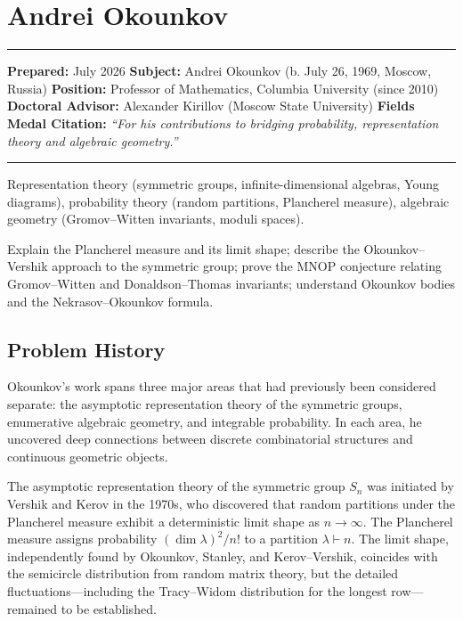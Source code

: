 \chapter{Andrei Okounkov}\label{ch2006andreiokounkov:andrei-okounkov-fields-medal-2006-a-comprehensive-report-on-his-work-and-impact}

\begin{center}\rule{0.5\linewidth}{0.5pt}\end{center}

\textbf{Prepared:} July 2026 \textbf{Subject:} Andrei Okounkov (b. July 26, 1969, Moscow, Russia) \textbf{Position:} Professor of Mathematics, Columbia University (since 2010) \textbf{Doctoral Advisor:} Alexander Kirillov (Moscow State University) \textbf{Fields Medal Citation:} \emph{``For his contributions to bridging probability, representation theory and algebraic geometry.''}

\begin{center}\rule{0.5\linewidth}{0.5pt}\end{center}

\begin{prereqs} Representation theory (symmetric groups, infinite-dimensional algebras, Young diagrams), probability theory (random partitions, Plancherel measure), algebraic geometry (Gromov--Witten invariants, moduli spaces). \end{prereqs}

\begin{objectives} Explain the Plancherel measure and its limit shape; describe the Okounkov--Vershik approach to the symmetric group; prove the MNOP conjecture relating Gromov--Witten and Donaldson--Thomas invariants; understand Okounkov bodies and the Nekrasov--Okounkov formula. \end{objectives}

\section{Problem History}

Okounkov's work \cite{okounkov2003} spans three major areas that had previously been considered separate: the asymptotic representation theory of the symmetric groups, enumerative algebraic geometry, and integrable probability. In each area, he uncovered deep connections between discrete combinatorial structures and continuous geometric objects.

The asymptotic representation theory of the symmetric group $S_n$ was initiated by Vershik and Kerov in the 1970s, who discovered that random partitions under the Plancherel measure exhibit a deterministic limit shape as $n \to \infty$. The Plancherel measure assigns probability $(\dim \lambda)^2/n!$ to a partition $\lambda \vdash n$. The limit shape, independently found by Okounkov, Stanley, and Kerov--Vershik, coincides with the semicircle distribution from random matrix theory, but the detailed fluctuations---including the Tracy--Widom distribution for the longest row---remained to be established.

